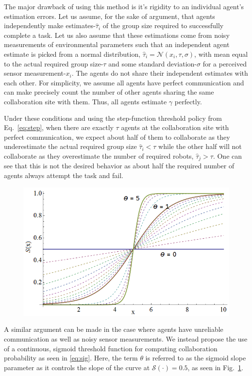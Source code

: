 \documentclass[conference]{ieeeconf}
\def\estt{\hat{\tau}}
\def\estg{\gamma}
\newcommand{\sig}{\mathcal{S}}
\begin{document}
The major drawback of using this method is it's rigidity to an individual agent's estimation errors. Let us assume, for the sake of argument, that agents independently make estimates-$\estt_i$ of the group size required to successfully complete a task. Let us also assume that these estimations come from noisy measurements of environmental parameters such that an independent agent estimate is picked from a normal distribution, $\estt_i = \mathcal{N}(x_i, \tau, \sigma)$, with mean equal to the actual required group size-$\tau$ and some standard deviation-$\sigma$ for a perceived sensor measurement-$x_i$. The agents do not share their independent estimates with each other. For simplicity, we assume all agents have perfect communication and can make precisely count the number of other agents sharing the same collaboration site with them. Thus, all agents estimate $\estg$ perfectly.

Under these conditions and using the step-function threshold policy from Eq.~\ref{eq:step}, when there are exactly $\tau$ agents at the collaboration site with perfect communication, we expect about half of them to collaborate as they underestimate the actual required group size $\estt_i < \tau$ while the other half will not collaborate as they overestimate the number of required robots, $\estt_j > \tau$. One can see that this is not the desired behavior as about half the required number of agents always attempt the task and fail.

\begin{figure}[!ht]
\centering\includegraphics[width=\columnwidth]{../figures/sigmoid1.png}
\centering\caption{}\label{fig:sigmoid}
\end{figure}

A similar argument can be made in the case where agents have unreliable communication as well as noisy sensor measurements. We instead propose the use of a continuous, sigmoid threshold function for computing collaboration probability as seen in \eqref{eq:sig}. Here, the term $\theta$ is referred to as the sigmoid slope parameter as it controls the slope of the curve at $\sig(\cdot) = 0.5$, as seen in Fig.~\ref{fig:sigmoid}.
\end{document}
